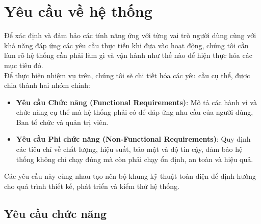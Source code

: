 \section{Yêu cầu về hệ thống}
\indent \indent Để xác định và đảm bảo các tính năng ứng với từng vai trò người dùng cùng với khả năng đáp ứng các yêu cầu thực tiễn khi đưa vào hoạt động, chúng tôi cần làm rõ hệ thống cần phải làm gì và vận hành như thế nào để hiện thực hóa các mục tiêu đó. \\
\indent Để thực hiện nhiệm vụ trên, chúng tôi sẽ chi tiết hóa các yêu cầu cụ thể, được chia thành hai nhóm chính: 
\begin{itemize}[leftmargin=3em]
    \item[1. ] \textbf{Yêu cầu Chức năng (Functional Requirements)}: Mô tả các hành vi và chức năng cụ thể mà hệ thống phải có để đáp ứng nhu cầu của người dùng, Ban tổ chức và quản trị viên.
    \item[2. ] \textbf{Yêu cầu Phi chức năng (Non-Functional Requirements)}: Quy định các tiêu chí về chất lượng, hiệu suất, bảo mật và độ tin cậy, đảm bảo hệ thống không chỉ chạy đúng mà còn phải chạy ổn định, an toàn và hiệu quả. 
\end{itemize}
\indent \indent Các yêu cầu này cùng nhau tạo nên bộ khung kỹ thuật toàn diện để định hướng cho quá trình thiết kế, phát triển và kiểm thử hệ thống.
\subsection{Yêu cầu chức năng}
